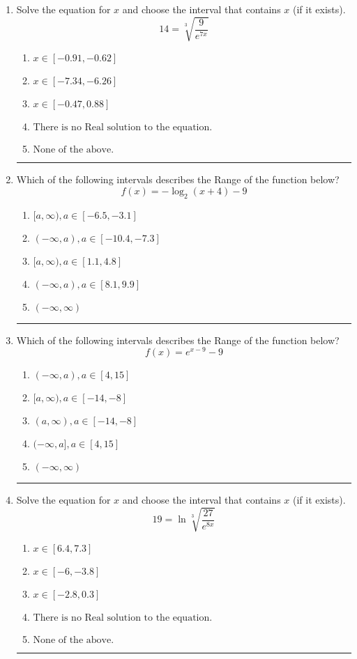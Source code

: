 \documentclass[14pt]{extbook}
\newcommand{\litem}[1]{\item#1\hspace*{-1cm}\rule{\textwidth}{0.4pt}}
\begin{document}
\begin{enumerate}
\litem{
 Solve the equation for $x$ and choose the interval that contains $x$ (if it exists).\[  14 = \sqrt[3]{\frac{9}{e^{7x}}} \]\begin{enumerate}[label=\Alph*.]
\item \( x \in [-0.91, -0.62] \)
\item \( x \in [-7.34, -6.26] \)
\item \( x \in [-0.47, 0.88] \)
\item \( \text{There is no Real solution to the equation.} \)
\item \( \text{None of the above.} \)

\end{enumerate} }
\litem{
Which of the following intervals describes the Range of the function below?\[ f(x) = -\log_2{(x+4)}-9 \]\begin{enumerate}[label=\Alph*.]
\item \( [a, \infty), a \in [-6.5, -3.1] \)
\item \( (-\infty, a), a \in [-10.4, -7.3] \)
\item \( [a, \infty), a \in [1.1, 4.8] \)
\item \( (-\infty, a), a \in [8.1, 9.9] \)
\item \( (-\infty, \infty) \)

\end{enumerate} }
\litem{
Which of the following intervals describes the Range of the function below?\[ f(x) = e^{x-9}-9 \]\begin{enumerate}[label=\Alph*.]
\item \( (-\infty, a), a \in [4, 15] \)
\item \( [a, \infty), a \in [-14, -8] \)
\item \( (a, \infty), a \in [-14, -8] \)
\item \( (-\infty, a], a \in [4, 15] \)
\item \( (-\infty, \infty) \)

\end{enumerate} }
\litem{
 Solve the equation for $x$ and choose the interval that contains $x$ (if it exists).\[  19 = \ln{\sqrt[3]{\frac{27}{e^{8x}}}} \]\begin{enumerate}[label=\Alph*.]
\item \( x \in [6.4, 7.3] \)
\item \( x \in [-6, -3.8] \)
\item \( x \in [-2.8, 0.3] \)
\item \( \text{There is no Real solution to the equation.} \)
\item \( \text{None of the above.} \)


\end{enumerate}}
\end{enumerate}
\end{document}
